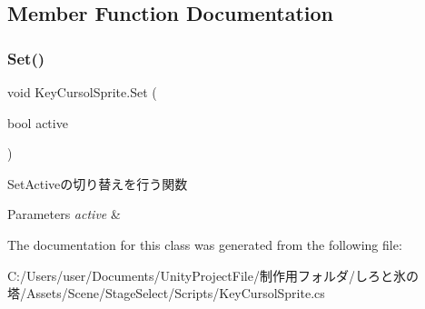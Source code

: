 \subsection{Member Function Documentation}
\mbox{\label{class_key_cursol_sprite_af7bfcfecf02445d3f94c86df3256c15b}} 
\subsubsection{\texorpdfstring{Set()}{Set()}}
{\footnotesize\ttfamily void Key\+Cursol\+Sprite.\+Set (\begin{DoxyParamCaption}\item[{bool}]{active }\end{DoxyParamCaption})\hspace{0.3cm}{\ttfamily [inline]}}



Set\+Activeの切り替えを行う関数 


\begin{DoxyParams}{Parameters}
{\em active} & \\
\hline
\end{DoxyParams}


The documentation for this class was generated from the following file\+:\begin{DoxyCompactItemize}
\item 
C\+:/\+Users/user/\+Documents/\+Unity\+Project\+File/制作用フォルダ/しろと氷の塔/\+Assets/\+Scene/\+Stage\+Select/\+Scripts/Key\+Cursol\+Sprite.\+cs\end{DoxyCompactItemize}
